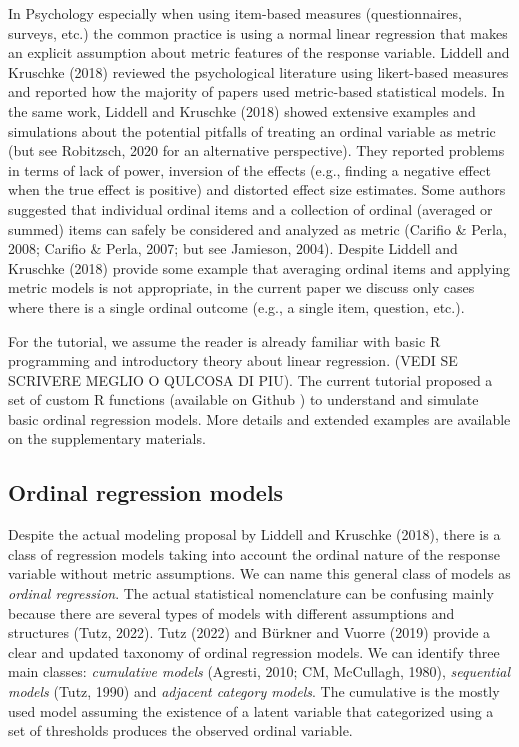 \documentclass[
  man,floatsintext]{apa6}
\begin{document}
In Psychology especially when using item-based measures (questionnaires, surveys, etc.) the common practice is using a normal linear regression that makes an explicit assumption about metric features of the response variable. Liddell and Kruschke (2018) reviewed the psychological literature using likert-based measures and reported how the majority of papers used metric-based statistical models. In the same work, Liddell and Kruschke (2018) showed extensive examples and simulations about the potential pitfalls of treating an ordinal variable as metric (but see Robitzsch, 2020 for an alternative perspective). They reported problems in terms of lack of power, inversion of the effects (e.g., finding a negative effect when the true effect is positive) and distorted effect size estimates. Some authors suggested that individual ordinal items and a collection of ordinal (averaged or summed) items can safely be considered and analyzed as metric (Carifio \& Perla, 2008; Carifio \& Perla, 2007; but see Jamieson, 2004). Despite Liddell and Kruschke (2018) provide some example that averaging ordinal items and applying metric models is not appropriate, in the current paper we discuss only cases where there is a single ordinal outcome (e.g., a single item, question, etc.).

For the tutorial, we assume the reader is already familiar with basic R programming and introductory theory about linear regression. (VEDI SE SCRIVERE MEGLIO O QULCOSA DI PIU). The current tutorial proposed a set of custom R functions (available on Github ) to understand and simulate basic ordinal regression models. More details and extended examples are available on the supplementary materials.

\subsection{Ordinal regression models}\label{ordinal-regression-models}

Despite the actual modeling proposal by Liddell and Kruschke (2018), there is a class of regression models taking into account the ordinal nature of the response variable without metric assumptions. We can name this general class of models as \emph{ordinal regression}. The actual statistical nomenclature can be confusing mainly because there are several types of models with different assumptions and structures (Tutz, 2022). Tutz (2022) and Bürkner and Vuorre (2019) provide a clear and updated taxonomy of ordinal regression models. We can identify three main classes: \emph{cumulative models} (Agresti, 2010; CM, McCullagh, 1980), \emph{sequential models} (Tutz, 1990) and \emph{adjacent category models}. The cumulative is the mostly used model assuming the existence of a latent variable that categorized using a set of thresholds produces the observed ordinal variable.
\end{document}
